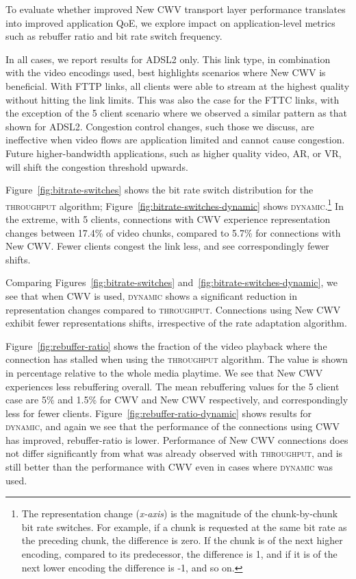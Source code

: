 \documentclass[10pt, acmlarge]{acmart}
\begin{document}
To evaluate whether improved New CWV transport layer performance translates into 
improved application QoE, we explore impact on application-level metrics such as 
rebuffer ratio and bit rate switch frequency. 

In all cases, we report results for ADSL2 only. This link type, in combination 
with the video encodings used, best highlights scenarios where New CWV is beneficial.
With FTTP links, all clients were able to stream at the highest quality without hitting 
the link limits. This was also the case for the FTTC links, with the exception of the 
5 client scenario where we observed a similar pattern as that shown for ADSL2. 
Congestion control changes, such those we discuss, are ineffective when video flows are 
application limited and cannot cause congestion. Future higher-bandwidth applications, 
such as higher quality video, AR, or VR, will shift the congestion threshold upwards.

Figure~\ref{fig:bitrate-switches} shows the bit rate switch distribution for the 
\textsc{throughput} algorithm; Figure~\ref{fig:bitrate-switches-dynamic} 
shows \textsc{dynamic}.\footnote{The representation change (\emph{x-axis}) is the 
magnitude of the chunk-by-chunk bit rate switches. For example, if a chunk is 
requested at the same bit rate as the preceding chunk, the difference is zero. 
If the chunk is of the next higher encoding, compared to its predecessor,
the difference is 1, and if it is of the next lower encoding the difference is -1, and so on.} 
In the extreme, with 5 clients, connections with CWV experience representation changes
between 17.4\% of video chunks, compared to 5.7\% for connections with New CWV.
 Fewer clients congest the link less, and see correspondingly fewer shifts.

Comparing Figures~\ref{fig:bitrate-switches} and~\ref{fig:bitrate-switches-dynamic},
 we see that when CWV is used, \textsc{dynamic} shows a significant reduction in 
 representation changes compared to \textsc{throughput}. Connections using New CWV 
 exhibit fewer representations shifts, irrespective of the rate adaptation algorithm.


Figure~\ref{fig:rebuffer-ratio} shows the fraction of the video playback where the 
connection has stalled when using the \textsc{throughput} algorithm. The value is shown 
in percentage relative to the whole media playtime. We see that New CWV experiences 
less rebuffering overall. The mean rebuffering values for the 5 client case are 
5\% and 1.5\% for CWV and New CWV respectively, and correspondingly less for fewer clients. 
Figure~\ref{fig:rebuffer-ratio-dynamic} shows results for \textsc{dynamic}, 
and again we see that the performance of the connections using CWV has improved, 
rebuffer-ratio is lower. Performance of New CWV connections does not differ 
significantly from what was already observed with \textsc{throughput}, 
and is still better than the performance with CWV even in cases where \textsc{dynamic} was used.
\end{document}
